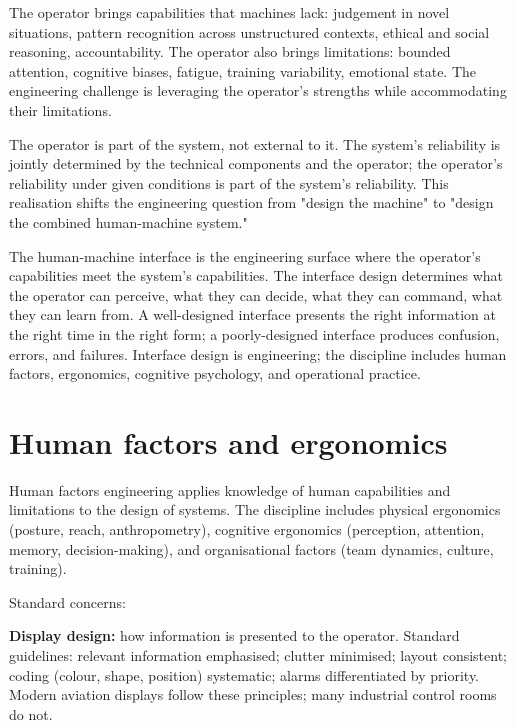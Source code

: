 The operator brings capabilities that machines lack: judgement in novel situations, pattern recognition across unstructured contexts, ethical and social reasoning, accountability. The operator also brings limitations: bounded attention, cognitive biases, fatigue, training variability, emotional state. The engineering challenge is leveraging the operator's strengths while accommodating their limitations.

The operator is part of the system, not external to it. The system's reliability is jointly determined by the technical components and the operator; the operator's reliability under given conditions is part of the system's reliability. This realisation shifts the engineering question from "design the machine" to "design the combined human-machine system."

\begin{archetype}
The human-machine interface is the engineering surface where the operator's capabilities meet the system's capabilities. The interface design determines what the operator can perceive, what they can decide, what they can command, what they can learn from. A well-designed interface presents the right information at the right time in the right form; a poorly-designed interface produces confusion, errors, and failures. Interface design is engineering; the discipline includes human factors, ergonomics, cognitive psychology, and operational practice.
\end{archetype}

\section{Human factors and ergonomics}

Human factors engineering applies knowledge of human capabilities and limitations to the design of systems. The discipline includes physical ergonomics (posture, reach, anthropometry), cognitive ergonomics (perception, attention, memory, decision-making), and organisational factors (team dynamics, culture, training).

Standard concerns:

\textbf{Display design:} how information is presented to the operator. Standard guidelines: relevant information emphasised; clutter minimised; layout consistent; coding (colour, shape, position) systematic; alarms differentiated by priority. Modern aviation displays follow these principles; many industrial control rooms do not.

